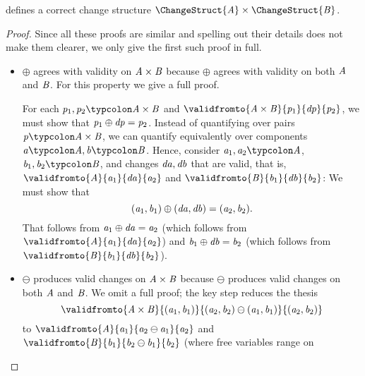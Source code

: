 \begin{lemma}
   defines a correct change structure \ensuremath{\ChangeStruct{\Conid{A}}\times\ChangeStruct{\Conid{B}}}.
\end{lemma}
\begin{proof}
Since all these proofs are similar and spelling out their details does not make
them clearer, we only give the first such proof in full.
  \begin{itemize}
  \item \ensuremath{\oplus } agrees with validity on \ensuremath{\Conid{A}\times\Conid{B}} because
    \ensuremath{\oplus } agrees with validity on both \ensuremath{\Conid{A}} and \ensuremath{\Conid{B}}. For this
    property we give a full proof.

    For each \ensuremath{\Varid{p}_{1},\Varid{p}_{2}\typcolon\Conid{A}\times\Conid{B}}
    and \ensuremath{\validfromto{\Conid{A}\times\Conid{B}}{\Varid{p}_{1}}{\Varid{dp}}{\Varid{p}_{2}}}, we must show that \ensuremath{\Varid{p}_{1}\oplus \Varid{dp}\mathrel{=}\Varid{p}_{2}}. Instead of quantifying over pairs \ensuremath{\Varid{p}\typcolon\Conid{A}\times\Conid{B}}, we can quantify equivalently over components \ensuremath{\Varid{a}\typcolon\Conid{A},\Varid{b}\typcolon\Conid{B}}.
    Hence, consider \ensuremath{\Varid{a}_{1},\Varid{a}_{2}\typcolon\Conid{A}}, \ensuremath{\Varid{b}_{1},\Varid{b}_{2}\typcolon\Conid{B}}, and changes \ensuremath{\Varid{da},\Varid{db}} that are valid, that is, \ensuremath{\validfromto{\Conid{A}}{\Varid{a}_{1}}{\Varid{da}}{\Varid{a}_{2}}} and \ensuremath{\validfromto{\Conid{B}}{\Varid{b}_{1}}{\Varid{db}}{\Varid{b}_{2}}}: We must show that \[(\mathit{a}_{1},\mathit{b}_{1})\oplus (\mathit{da},\mathit{db})\mathrel{=}(\mathit{a}_{2},\mathit{b}_{2}).\] That follows from \ensuremath{\Varid{a}_{1}\oplus \Varid{da}\mathrel{=}\Varid{a}_{2}} (which
    follows from \ensuremath{\validfromto{\Conid{A}}{\Varid{a}_{1}}{\Varid{da}}{\Varid{a}_{2}}}) and \ensuremath{\Varid{b}_{1}\oplus \Varid{db}\mathrel{=}\Varid{b}_{2}}
    (which follows from \ensuremath{\validfromto{\Conid{B}}{\Varid{b}_{1}}{\Varid{db}}{\Varid{b}_{2}}}).
  \item \ensuremath{\ominus } produces valid changes on \ensuremath{\Conid{A}\times\Conid{B}}
    because \ensuremath{\ominus } produces valid changes on both \ensuremath{\Conid{A}} and
    \ensuremath{\Conid{B}}. We omit a full proof; the key step reduces the thesis
    \[\ensuremath{\validfromto{\Conid{A}\times\Conid{B}}{(\Varid{a}_{1},\Varid{b}_{1})}{(\Varid{a}_{2},\Varid{b}_{2})\ominus (\Varid{a}_{1},\Varid{b}_{1})}{(\Varid{a}_{2},\Varid{b}_{2})}}\] to \ensuremath{\validfromto{\Conid{A}}{\Varid{a}_{1}}{\Varid{a}_{2}\ominus \Varid{a}_{1}}{\Varid{a}_{2}}} and \ensuremath{\validfromto{\Conid{B}}{\Varid{b}_{1}}{\Varid{b}_{2}\ominus \Varid{b}_{1}}{\Varid{b}_{2}}} (where free variables range on

\end{itemize}
\end{proof}
